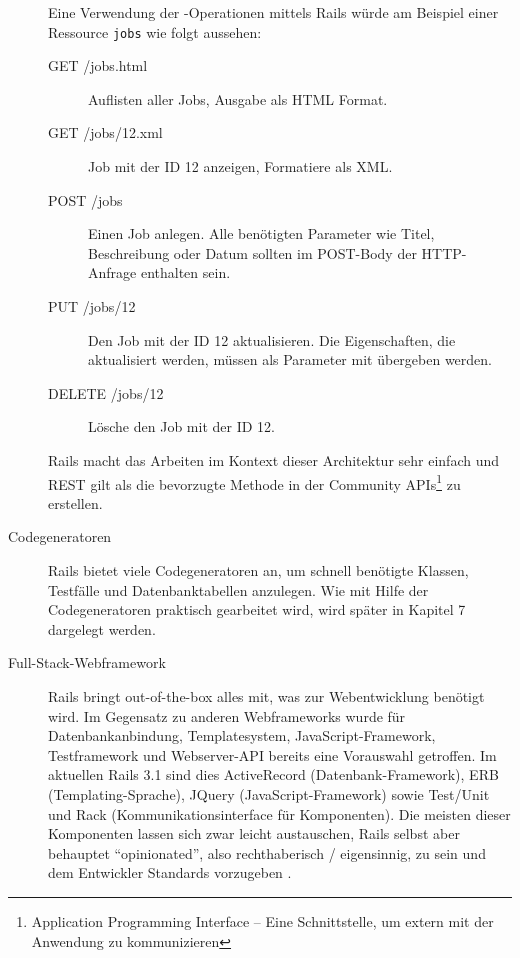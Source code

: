 \begin{description}
 Eine Verwendung der -Operationen mittels Rails würde am Beispiel einer Ressource \texttt{jobs} wie folgt aussehen:
  \begin{description}
  \item[GET /jobs.html] Auflisten aller Jobs, Ausgabe als HTML Format.
  \item[GET /jobs/12.xml] Job mit der ID 12 anzeigen, Formatiere als XML.
  \item[POST /jobs] Einen Job anlegen. Alle benötigten Parameter wie Titel, Beschreibung oder Datum sollten im POST-Body der HTTP-Anfrage enthalten sein.
  \item[PUT /jobs/12] Den Job mit der ID 12 aktualisieren. Die Eigenschaften, die aktualisiert werden, müssen als Parameter mit übergeben werden.
  \item[DELETE /jobs/12] Lösche den Job mit der ID 12.
  \end{description}
 Rails macht das Arbeiten im Kontext dieser Architektur sehr einfach und REST gilt als die bevorzugte Methode in der Community APIs\footnote{Application Programming Interface --  Eine Schnittstelle, um extern mit der Anwendung zu kommunizieren} zu erstellen.
 \item[Codegeneratoren] Rails bietet viele Codegeneratoren an, um schnell benötigte Klassen, Testfälle und Datenbanktabellen anzulegen.  Wie mit Hilfe der Codegeneratoren praktisch gearbeitet wird, wird später in Kapitel 7 dargelegt werden.
 \item[Full-Stack-Webframework] Rails 
bringt out-of-the-box alles mit, was zur Webentwicklung benötigt wird. Im Gegensatz zu anderen Webframeworks wurde für Datenbankanbindung, Templatesystem, JavaScript-Framework, Testframework und Webserver-API bereits eine Vorauswahl getroffen. Im aktuellen Rails 3.1 sind dies ActiveRecord (Datenbank-Framework), ERB (Templating-Sprache), JQuery (JavaScript-Framework) sowie Test/Unit und Rack (Kommunikationsinterface für Komponenten). Die meisten dieser Komponenten lassen sich zwar leicht austauschen, Rails selbst aber behauptet "`opinionated"', also rechthaberisch / eigensinnig, zu sein und dem Entwickler Standards vorzugeben \citep{david_heinemeier_hansson_railsconf_2011}.

\end{description}

